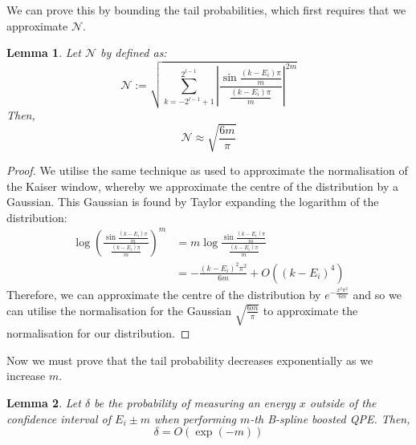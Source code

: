 \documentclass[aps,prx,twocolumn,floatfix,10pt,amssymb,amsfont,amsmath,superscriptaddress,float,nofootinbib,longbibliography,nobalancelastpage]{revtex4-2}
\newtheorem{lemma}{Lemma}[theorem]
\theoremstyle{empty}
\begin{document}
We can prove this by bounding the tail probabilities, which first requires that we approximate $\mathcal{N}$.
\begin{lemma}
    Let $\mathcal{N}$ by defined as:
    \begin{equation}
       \mathcal{N} := \sqrt{\sum_{k=-2^{l-1}+1}^{2^{l-1}} \left|\frac{\sin \frac{(k-E_i)\pi}{m}}{ \frac{(k-E_i)\pi}{m}}\right|^{2m}}
    \end{equation} 
    Then, 
    \begin{equation}
        \mathcal{N} \approx \sqrt{\frac{6m}{\pi}}
    \end{equation}
    \label{lemma:bspline_norm}
\end{lemma}
\begin{proof}
    We utilise the same technique as \cite{Berry:2022ccu} used to approximate the normalisation of the Kaiser window, whereby we approximate the centre of the distribution by a Gaussian. This Gaussian is found by Taylor expanding the logarithm of the distribution:
    \begin{align}
                \log \left(\frac{\sin \frac{(k-E_i)\pi}{m}}{ \frac{(k-E_i)\pi}{m}}\right)^m &= m \log \frac{\sin \frac{(k-E_i)\pi}{m}}{ \frac{(k-E_i)\pi}{m}}\\
                &= - \frac{(k-E_i)^2 \pi^2}{6m} + O\left((k-E_i)^4\right)
    \end{align}
    Therefore, we can approximate the centre of the distribution by $e^{ - \frac{x^2 \pi^2}{6m}}$ and so we can utilise the normalisation for the Gaussian $\sqrt{\frac{6m}{\pi}}$ to approximate the normalisation for our distribution.

\end{proof}
Now we must prove that the tail probability decreases exponentially as we increase $m$.
\begin{lemma}
    Let $\delta$ be the probability of measuring an energy $x$ outside of the confidence interval of $E_i\pm m$ when performing $m$-th B-spline boosted QPE. Then,
    \begin{equation}
        \delta = O\left(\exp (-m)\right)
    \end{equation}
    \label{lemma:bspline_prob}
\end{lemma}
\end{document}
